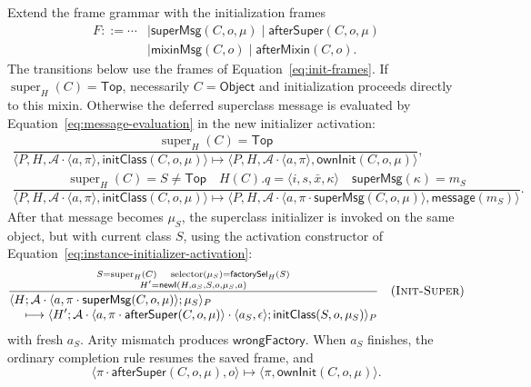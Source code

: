 \documentclass[11pt]{article}
\numberwithin{equation}{section}
\newcommand{\kw}[1]{\ensuremath{\mathsf{#1}}}
\newcommand{\Top}{\kw{Top}}
\newcommand{\Object}{\kw{Object}}
\newcommand{\super}{\mathop{\mathrm{super}}}
\newcommand{\selector}{\mathop{\mathrm{selector}}}
\newcommand{\rulelabel}[1]{\textsc{#1}}
\begin{document}
Extend the frame grammar with the initialization frames
\begin{equation}\label{eq:init-frames}
\begin{split}
 F::=\cdots&\mid\kw{superMsg}(C,o,\mu)
 \mid\kw{afterSuper}(C,o,\mu)\\
 &\mid\kw{mixinMsg}(C,o)
 \mid\kw{afterMixin}(C,o).
\end{split}
\end{equation}
The transitions below use the frames of Equation~\eqref{eq:init-frames}.  If
$\super_H(C)=\Top$, necessarily $C=\Object$ and initialization proceeds
directly to this mixin.  Otherwise the deferred superclass message is evaluated
by Equation~\eqref{eq:message-evaluation} in the new initializer activation:
\begin{equation}\label{eq:init-class}
\begin{array}{c}
\dfrac{\super_H(C)=\Top}
 {\langle P,H,\mathcal A\cdot\langle a,\pi\rangle,
    \kw{initClass}(C,o,\mu)\rangle
  \longmapsto
  \langle P,H,\mathcal A\cdot\langle a,\pi\rangle,
    \kw{ownInit}(C,o,\mu)\rangle},\\[4mm]
\dfrac{\super_H(C)=S\ne\Top\quad H(C).q=\langle i,s,\bar x,\kappa\rangle
       \quad \mathsf{superMsg}(\kappa)=m_S}
 {\langle P,H,\mathcal A\cdot\langle a,\pi\rangle,
    \kw{initClass}(C,o,\mu)\rangle
  \longmapsto
  \langle P,H,\mathcal A\cdot
    \langle a,\pi\cdot\kw{superMsg}(C,o,\mu)\rangle,
    \kw{message}(m_S)\rangle}.
\end{array}
\end{equation}
After that message becomes $\mu_S$, the superclass initializer is invoked on
the same object, but with current class $S$, using the activation constructor
of Equation~\eqref{eq:instance-initializer-activation}:
\[
\dfrac{\substack{S=\super_H(C)\quad
       \selector(\mu_S)=\mathsf{factorySel}_H(S)\\
       H'=\mathsf{newI}(H,a_S,S,o,\mu_S,a)}}
 {\begin{aligned}
  &\langle H;\mathcal A\cdot\langle a,
       \pi\cdot\kw{superMsg}(C,o,\mu)\rangle;\mu_S\rangle_P\\[-1mm]
  &\quad\longmapsto
   \langle H';\mathcal A\cdot
       \langle a,\pi\cdot\kw{afterSuper}(C,o,\mu)\rangle
       \cdot\langle a_S,\epsilon\rangle;
       \kw{initClass}(S,o,\mu_S)\rangle_P
 \end{aligned}}
\quad(\rulelabel{Init-Super})
\]
with fresh $a_S$.  Arity mismatch produces $\kw{wrongFactory}$.  When $a_S$
finishes, the ordinary
completion rule resumes the saved frame, and
\begin{equation}\label{eq:after-super}
 \langle\pi\cdot\kw{afterSuper}(C,o,\mu),o\rangle
 \longmapsto\langle\pi,\kw{ownInit}(C,o,\mu)\rangle.
\end{equation}
\end{document}
